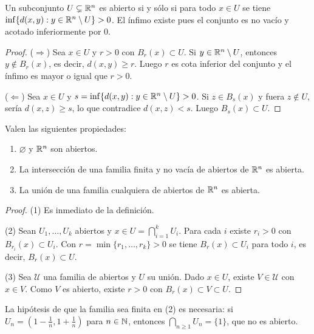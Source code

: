 \begin{prop}
  Un subconjunto \(U \subsetneq \mathbb{R}^n\) es abierto si y sólo si para todo \(x \in U\) se tiene \(\inf \{ d(x, y) : y \in \mathbb{R}^n \setminus U \} > 0\). El ínfimo existe pues el conjunto es no vacío y acotado inferiormente por \(0\).
\end{prop}

\begin{proof}
  (\(\Rightarrow\)) Sea \(x \in U\) y \(r > 0\) con \(B_r(x) \subset U\). Si \(y \in \mathbb{R}^n \setminus U\), entonces \(y \notin B_r(x)\), es decir, \(d(x, y) \geq r\). Luego \(r\) es cota inferior del conjunto y el ínfimo es mayor o igual que \(r > 0\).

  (\(\Leftarrow\)) Sea \(x \in U\) y \(s = \inf \{ d(x, y) : y \in \mathbb{R}^n \setminus U \} > 0\). Si \(z \in B_s(x)\) y fuera \(z \notin U\), sería \(d(x, z) \geq s\), lo que contradice \(d(x, z) < s\). Luego \(B_s(x) \subset U\).
\end{proof}

\begin{prop}
  Valen las siguientes propiedades:
  \begin{enumerate}[label=(\arabic*)]
    \item \(\varnothing\) y \(\mathbb{R}^n\) son abiertos.
    \item La intersección de una familia finita y no vacía de abiertos de \(\mathbb{R}^n\) es abierta.
    \item La unión de una familia cualquiera de abiertos de \(\mathbb{R}^n\) es abierta.
  \end{enumerate}
\end{prop}

\begin{proof}
  (1) Es inmediato de la definición.

  (2) Sean \(U_1, \dots, U_k\) abiertos y \(x \in U = \bigcap_{i=1}^{k} U_i\). Para cada \(i\) existe \(r_i > 0\) con \(B_{r_i}(x) \subset U_i\). Con \(r = \min\{r_1, \dots, r_k\} > 0\) se tiene \(B_r(x) \subset U_i\) para todo \(i\), es decir, \(B_r(x) \subset U\).

  (3) Sea \(\mathscr{U}\) una familia de abiertos y \(U\) su unión. Dado \(x \in U\), existe \(V \in \mathscr{U}\) con \(x \in V\). Como \(V\) es abierto, existe \(r > 0\) con \(B_r(x) \subset V \subset U\).
\end{proof}

La hipótesis de que la familia sea finita en (2) es necesaria: si \(U_n = \left( 1 - \frac{1}{n}, 1 + \frac{1}{n} \right)\) para \(n \in \mathbb{N}\), entonces \(\bigcap_{n \geq 1} U_n = \{1\}\), que no es abierto.

